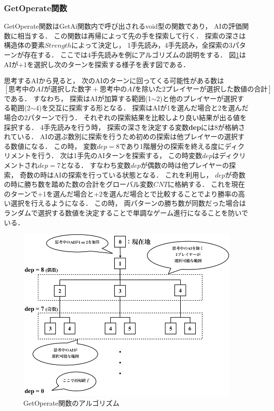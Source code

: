 \documentclass[a4paper,10pt]{jsarticle}
\begin{document}
\subsubsection{GetOperate関数}
GetOperate関数はGetAi関数内で呼び出されるvoid型の関数であり，
AIの評価関数に相当する．
この関数は再帰によって先の手を探索して行く．
探索の深さは構造体の要素$Strength$によって決定し，
1手先読み，4手先読み，全探索の3パターンが存在する．
ここでは4手先読みを例にアルゴリズムの説明をする．
図\ref{fig:AI_think}はAIが+1を選択し次のターンを探索する様子を表す図である．\par
思考するAIから見ると，
次のAIのターンに回ってくる可能性がある数は
$$[思考中のAIが選択した数字+思考中のAIを除いた2プレイヤーが選択した数値の合計]$$
である．
すなわち，
探索はAIが加算する範囲(1$\sim$2)と他のプレイヤーが選択する範囲(2$\sim$4)を交互に探索する形となる．
探索はAIが1を選んだ場合と2を選んだ場合の2パターンで行う．
それぞれの探索結果を比較しより良い結果が出る値を採択する．
4手先読みを行う時，
探索の深さを決定する変数\textbf{dep}には8が格納されている．
AIの選ぶ数別に探索を行うため初めの探索は他プレイヤーの選択する数値になる．
この時，
変数$dep=8$であり1階層分の探索を終える度にディクリメントを行う．
次は1手先のAIターンを探索する，
この時変数$dep$はディクリメントされ$dep=7$となる．
すなわち変数$dep$が偶数の時は他プレイヤーの探索，
奇数の時はAIの探索を行っている状態となる．
これを利用し，
$dep$が奇数の時に勝ち数を踏めた数の合計をグローバル変数$CNT$に格納する．
これを現在のターンで+1を選んだ場合と+2を選んだ場合とで比較することでより勝率の高い選択を行えるようになる．
この時，
両パターンの勝ち数が同数だった場合はランダムで選択する数値を決定することで単調なゲーム進行になることを防いでいる．
\begin{figure}[h]
  \centering
  \includegraphics[width=140mm]{./image/AI_Think.png}
  \caption{GetOperate関数のアルゴリズム}
  \label{fig:AI_think}
\end{figure}
\end{document}
